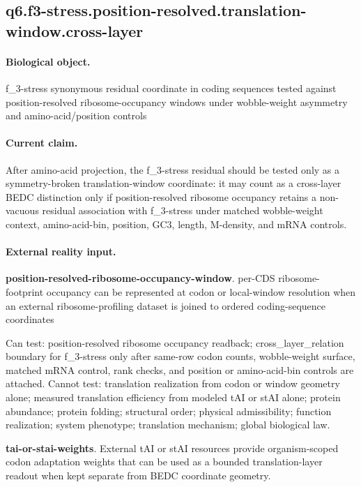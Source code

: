\subsection{q6.f3-stress.position-resolved.translation-window.cross-layer}

\paragraph{Biological object.} f\_3-stress synonymous residual coordinate in coding sequences tested against position-resolved ribosome-occupancy windows under wobble-weight asymmetry and amino-acid/position controls

\paragraph{Current claim.} After amino-acid projection, the f\_3-stress residual should be tested only as a symmetry-broken translation-window coordinate: it may count as a cross-layer BEDC distinction only if position-resolved ribosome occupancy retains a non-vacuous residual association with f\_3-stress under matched wobble-weight context, amino-acid-bin, position, GC3, length, M-density, and mRNA controls.

\paragraph{External reality input.}
\textbf{position-resolved-ribosome-occupancy-window}. per-CDS ribosome-footprint occupancy can be represented at codon or local-window resolution when an external ribosome-profiling dataset is joined to ordered coding-sequence coordinates

Can test: position-resolved ribosome occupancy readback; cross\_layer\_relation boundary for f\_3-stress only after same-row codon counts, wobble-weight surface, matched mRNA control, rank checks, and position or amino-acid-bin controls are attached. Cannot test: translation realization from codon or window geometry alone; measured translation efficiency from modeled tAI or stAI alone; protein abundance; protein folding; structural order; physical admissibility; function realization; system phenotype; translation mechanism; global biological law.

\textbf{tai-or-stai-weights}. External tAI or stAI resources provide organism-scoped codon adaptation weights that can be used as a bounded translation-layer readout when kept separate from BEDC coordinate geometry.

